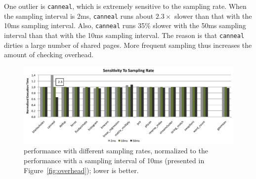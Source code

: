 One outlier is \texttt{canneal}, which is extremely sensitive to the sampling rate.  When the sampling interval is 2ms, \texttt{canneal} runs about $2.3\times$ slower than that with  the 10ms sampling interval. Also, \texttt{canneal} runs 35\% slower with the 50ms sampling interval than that with the 10ms
sampling interval. The reason is that \texttt{canneal} dirties a large number of shared pages. More frequent sampling thus increases the amount of checking overhead.


\begin{figure}[!t]
\centering
\includegraphics[width=5in]{sheriff/figure/sensitivity}
\caption{\sheriffdetect{} performance with different sampling rates,  normalized to the performance with a sampling interval of 10ms (presented in Figure~\ref{fig:overhead}); lower is better.
\label{fig:sensitivity}}
\end{figure}

\begin{table}[!t]
\centering
{}
\caption{
\sheriffdetect{} precision with different sampling rates, including the number of falsely-shared objects and interleaved writes. We omit those benchmarks with no observed cases of false sharing.
\label{table:samplingquality}}
\end{table}

